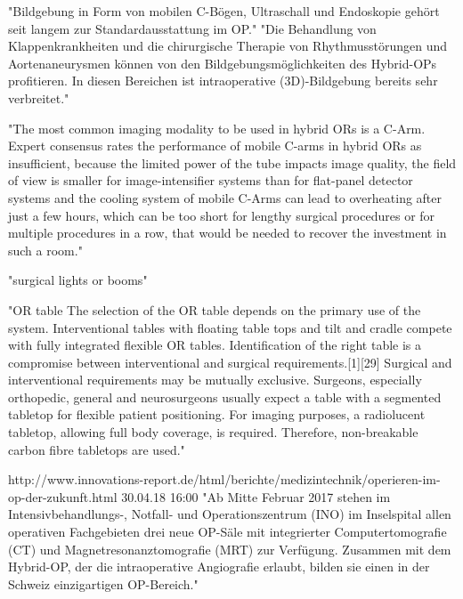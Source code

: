 	 "Bildgebung in Form von mobilen C-Bögen, Ultraschall und Endoskopie gehört seit langem zur Standardausstattung im OP."
	 "Die Behandlung von Klappenkrankheiten und die chirurgische Therapie von Rhythmusstörungen und Aortenaneurysmen können von den Bildgebungsmöglichkeiten des Hybrid-OPs profitieren. In diesen Bereichen ist intraoperative (3D)-Bildgebung bereits sehr verbreitet."

	"The most common imaging modality to be used in hybrid ORs is a C-Arm. Expert consensus rates the performance of mobile C-arms in hybrid ORs as insufficient, because the limited power of the tube impacts image quality, the field of view is smaller for image-intensifier systems than for flat-panel detector systems and the cooling system of mobile C-Arms can lead to overheating after just a few hours, which can be too short for lengthy surgical procedures or for multiple procedures in a row, that would be needed to recover the investment in such a room."
	
	"surgical lights or booms"
	
	"OR table
	The selection of the OR table depends on the primary use of the system. Interventional tables with floating table tops and tilt and cradle compete with fully integrated flexible OR tables. Identification of the right table is a compromise between interventional and surgical requirements.[1][29] Surgical and interventional requirements may be mutually exclusive. Surgeons, especially orthopedic, general and neurosurgeons usually expect a table with a segmented tabletop for flexible patient positioning. For imaging purposes, a radiolucent tabletop, allowing full body coverage, is required. Therefore, non-breakable carbon fibre tabletops are used."
	
http://www.innovations-report.de/html/berichte/medizintechnik/operieren-im-op-der-zukunft.html 30.04.18 16:00	
	"Ab Mitte Februar 2017 stehen im Intensivbehandlungs-, Notfall- und Operationszentrum (INO) im Inselspital allen operativen Fachgebieten drei neue OP-Säle mit integrierter Computertomografie (CT) und Magnetresonanztomografie (MRT) zur Verfügung. Zusammen mit dem Hybrid-OP, der die intraoperative Angiografie erlaubt, bilden sie einen in der Schweiz einzigartigen OP-Bereich."

